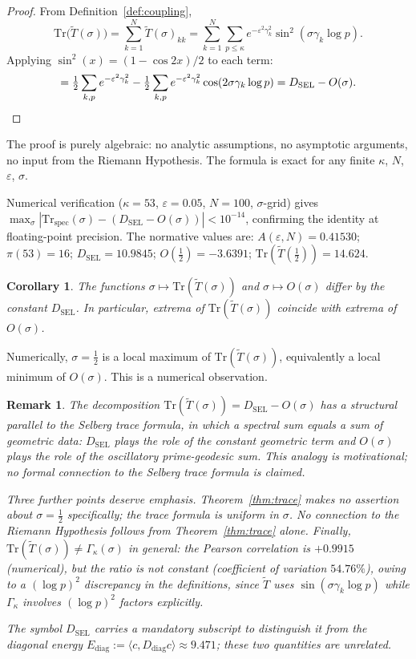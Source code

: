 \documentclass[11pt]{article}
\newtheorem{corollary}[theorem]{Corollary}
\newtheorem*{remark}{Remark}
\newcommand{\Tt}{\widetilde{T}}
\newcommand{\DSEL}{D_{\mathrm{SEL}}}
\newcommand{\Ediag}{E_{\mathrm{diag}}}
\begin{document}
\begin{proof}
From Definition~\ref{def:coupling},
\[
\mathrm{Tr}\bigl(\Tt(\sigma)\bigr)
  = \sum_{k=1}^N \Tt(\sigma)_{kk}
  = \sum_{k=1}^N\sum_{p\leq\kappa}
    e^{-\varepsilon^2\gamma_k^2}\sin^2(\sigma\gamma_k\log p).
\]
Applying $\sin^2(x)=(1-\cos 2x)/2$ to each term:
\[
= \tfrac{1}{2}\sum_{k,p} e^{-\varepsilon^2\gamma_k^2}
  - \tfrac{1}{2}\sum_{k,p} e^{-\varepsilon^2\gamma_k^2}\cos(2\sigma\gamma_k\log p)
  = \DSEL - O(\sigma). \qedhere
\]
\end{proof}

The proof is purely algebraic: no analytic assumptions, no asymptotic
arguments, no input from the Riemann Hypothesis.
The formula is exact for any finite $\kappa$, $N$, $\varepsilon$, $\sigma$.

Numerical verification ($\kappa=53$, $\varepsilon=0.05$, $N=100$,
$\sigma$-grid) gives
$\max_\sigma|\mathrm{Tr}_{\mathrm{spec}}(\sigma)-(\DSEL-O(\sigma))|<10^{-14}$,
confirming the identity at floating-point precision.
The normative values are:
$A(\varepsilon,N)=0.41530$; $\pi(53)=16$;
$\DSEL = 10.9845$; $O(\tfrac{1}{2})=-3.6391$;
$\mathrm{Tr}(\Tt(\tfrac{1}{2}))=14.624$.

\begin{corollary}
\label{cor:extrema}
The functions $\sigma\mapsto\mathrm{Tr}(\Tt(\sigma))$ and
$\sigma\mapsto O(\sigma)$ differ by the constant $\DSEL$.
In particular, extrema of $\mathrm{Tr}(\Tt(\sigma))$ coincide
with extrema of $O(\sigma)$.
\end{corollary}

Numerically, $\sigma=\tfrac{1}{2}$ is a local maximum of
$\mathrm{Tr}(\Tt(\sigma))$, equivalently a local minimum of $O(\sigma)$.
This is a numerical observation.

\begin{remark}
The decomposition $\mathrm{Tr}(\Tt(\sigma))=\DSEL-O(\sigma)$
has a structural parallel to the Selberg trace formula,
in which a spectral sum equals a sum of geometric data:
$\DSEL$ plays the role of the constant geometric term and
$O(\sigma)$ plays the role of the oscillatory prime-geodesic sum.
This analogy is motivational; no formal connection to the
Selberg trace formula is claimed.

Three further points deserve emphasis.
Theorem~\ref{thm:trace} makes no assertion about $\sigma=\tfrac{1}{2}$
specifically; the trace formula is uniform in $\sigma$.
No connection to the Riemann Hypothesis follows from
Theorem~\ref{thm:trace} alone.
Finally, $\mathrm{Tr}(\Tt(\sigma))\neq\Gamma_\kappa(\sigma)$ in general:
the Pearson correlation is $+0.9915$ (numerical), but the ratio is not
constant (coefficient of variation $54.76\%$), owing to a $(\log p)^2$
discrepancy in the definitions, since $\Tt$ uses $\sin(\sigma\gamma_k\log p)$
while $\Gamma_\kappa$ involves $(\log p)^2$ factors explicitly.

The symbol $\DSEL$ carries a mandatory subscript to distinguish it
from the diagonal energy $\Ediag := \langle c,D_{\mathrm{diag}}c\rangle
\approx 9.471$; these two quantities are unrelated.
\end{remark}
\end{document}

